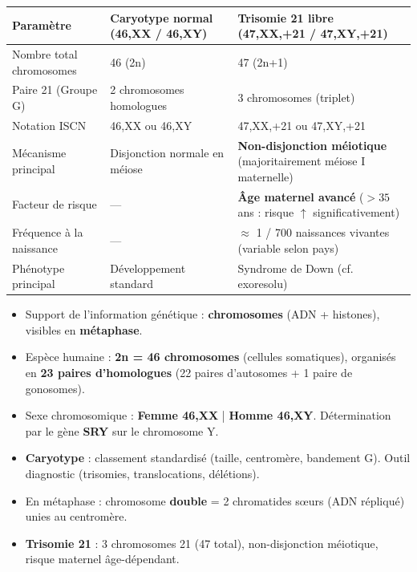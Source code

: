 \documentclass[11pt]{article}
\begin{document}
\begin{center}
\begin{tabularx}{\linewidth}{|l|X|X|}
\hline
\rowcolor{popblueL}
\textbf{Paramètre} & \textbf{Caryotype normal (46,XX / 46,XY)} & \textbf{Trisomie 21 libre (47,XX,+21 / 47,XY,+21)} \\
\hline
Nombre total chromosomes & 46 (2n) & 47 (2n+1) \\
\hline
Paire 21 (Groupe G) & 2 chromosomes homologues & 3 chromosomes (triplet) \\
\hline
Notation ISCN & 46,XX ou 46,XY & 47,XX,+21 ou 47,XY,+21 \\
\hline
Mécanisme principal & Disjonction normale en méiose & \textbf{Non-disjonction méiotique} (majoritairement méiose I maternelle) \\
\hline
Facteur de risque & — & \textbf{Âge maternel avancé} ($>35$ ans : risque $\uparrow$ significativement) \\
\hline
Fréquence à la naissance & — & $\approx$ 1 / 700 naissances vivantes (variable selon pays) \\
\hline
Phénotype principal & Développement standard & Syndrome de Down (cf. exoresolu) \\
\hline
\end{tabularx}
\end{center}

\begin{aretenir}
\begin{itemize}
    \item Support de l'information génétique : \textbf{chromosomes} (ADN + histones), visibles en \textbf{métaphase}.
    \item Espèce humaine : \textbf{2n = 46 chromosomes} (cellules somatiques), organisés en \textbf{23 paires d'homologues} (22 paires d'autosomes + 1 paire de gonosomes).
    \item Sexe chromosomique : \textbf{Femme 46,XX} | \textbf{Homme 46,XY}. Détermination par le gène \textbf{SRY} sur le chromosome Y.
    \item \textbf{Caryotype} : classement standardisé (taille, centromère, bandement G). Outil diagnostic (trisomies, translocations, délétions).
    \item En métaphase : chromosome \textbf{double} = 2 chromatides sœurs (ADN répliqué) unies au centromère.
    \item \textbf{Trisomie 21} : 3 chromosomes 21 (47 total), non-disjonction méiotique, risque maternel âge-dépendant.
\end{itemize}
\end{aretenir}
\end{document}

